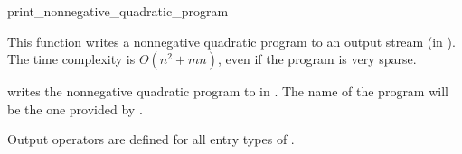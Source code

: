 \begin{ccRefFunction}{print_nonnegative_quadratic_program}


This function writes a nonnegative quadratic program
to an output stream (in ). The time
complexity is $\Theta (n^2 + mn)$, even if the program is very sparse.

{writes the nonnegative quadratic program  to  in 
. The name of the program will be the one provided 
by .}

Output operators are defined for all entry types of .

\end{ccRefFunction}
